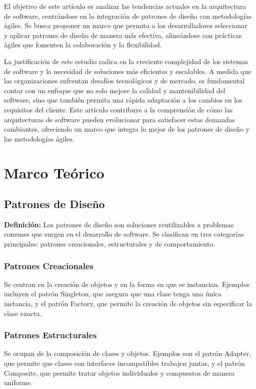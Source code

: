 \documentclass{article}
\begin{document}
El objetivo de este artículo es analizar las tendencias actuales en la arquitectura de software, centrándose en la integración de patrones de diseño con metodologías ágiles. Se busca proponer un marco que permita a los desarrolladores seleccionar y aplicar patrones de diseño de manera más efectiva, alineándose con prácticas ágiles que fomenten la colaboración y la flexibilidad.

La justificación de este estudio radica en la creciente complejidad de los sistemas de software y la necesidad de soluciones más eficientes y escalables. A medida que las organizaciones enfrentan desafíos tecnológicos y de mercado, es fundamental contar con un enfoque que no solo mejore la calidad y mantenibilidad del software, sino que también permita una rápida adaptación a los cambios en los requisitos del cliente. Este artículo contribuye a la comprensión de cómo las arquitecturas de software pueden evolucionar para satisfacer estas demandas cambiantes, ofreciendo un marco que integra lo mejor de los patrones de diseño y las metodologías ágiles.

\section{Marco Teórico}

\subsection{Patrones de Diseño}
\textbf{Definición:} Los patrones de diseño son soluciones reutilizables a problemas comunes que surgen en el desarrollo de software. Se clasifican en tres categorías principales: patrones creacionales, estructurales y de comportamiento.

\subsubsection{Patrones Creacionales}
Se centran en la creación de objetos y en la forma en que se instancian. Ejemplos incluyen el patrón Singleton, que asegura que una clase tenga una única instancia, y el patrón Factory, que permite la creación de objetos sin especificar la clase exacta.

\subsubsection{Patrones Estructurales}
Se ocupan de la composición de clases y objetos. Ejemplos son el patrón Adapter, que permite que clases con interfaces incompatibles trabajen juntas, y el patrón Composite, que permite tratar objetos individuales y compuestos de manera uniforme.
\end{document}
